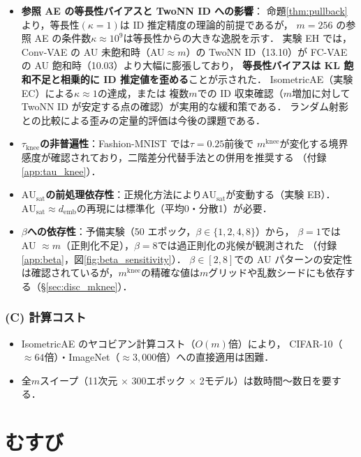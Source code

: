 \documentclass[11pt,a4paper]{jsarticle}
\newcommand{\kap}{\kappa}
\newcommand{\AUsat}{\mathrm{AU}_{\mathrm{sat}}}
\newcommand{\mknee}{m^{\mathrm{knee}}}
\newcommand{\demb}{d_{\mathrm{emb}}}
\begin{document}
\begin{itemize}
  \item \textbf{参照 AE の等長性バイアスと TwoNN ID への影響}：
        命題\ref{thm:pullback}より，等長性$(\kap = 1)$は ID 推定精度の理論的前提であるが，
        $m = 256$ の参照 AE の条件数$\kap \approx 10^9$は等長性からの大きな逸脱を示す．
        実験 EH では，Conv-VAE の AU 未飽和時（AU$\approx m$）の TwoNN ID（13.10）が
        FC-VAE の AU 飽和時（10.03）より大幅に膨張しており，
        \textbf{等長性バイアスは KL 飽和不足と相乗的に ID 推定値を歪める}ことが示された．
        IsometricAE（実験 EC）による$\kap \approx 1$の達成，または
        複数$m$での ID 収束確認（$m$増加に対して TwoNN ID が安定する点の確認）が実用的な緩和策である．
        ランダム射影との比較による歪みの定量的評価は今後の課題である．
  \item \textbf{$\tau_{\mathrm{knee}}$の非普遍性}：Fashion-MNIST では$\tau = 0.25$前後で
        $\mknee$が変化する境界感度が確認されており，二階差分代替手法との併用を推奨する
        （付録\ref{app:tau_knee}）．
  \item \textbf{$\AUsat$の前処理依存性}：正規化方法により$\AUsat$が変動する（実験 EB）．
        $\AUsat \approx \demb$の再現には標準化（平均0・分散1）が必要．
  \item \textbf{$\beta$への依存性}：予備実験（50 エポック，$\beta \in \{1,2,4,8\}$）から，
        $\beta = 1$では AU $\approx m$（正則化不足），$\beta = 8$では過正則化の兆候が観測された
        （付録\ref{app:beta}，図\ref{fig:beta_sensitivity}）．
        $\beta \in [2, 8]$での AU パターンの安定性は確認されているが，$\mknee$の精確な値は$m$グリッドや乱数シードにも依存する（§\ref{sec:disc_mknee}）．
\end{itemize}

\subsubsection*{(C) 計算コスト}

\begin{itemize}
  \item IsometricAE のヤコビアン計算コスト（$O(m)$倍）により，
        CIFAR-10（$\approx 64$倍）・ImageNet（$\approx 3{,}000$倍）への直接適用は困難．
  \item 全$m$スイープ（11次元 $\times$ 300エポック $\times$ 2モデル）は数時間〜数日を要する．
\end{itemize}

\section{むすび}\label{sec:conclusion}
\end{document}
